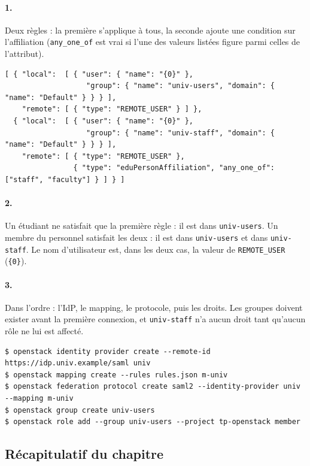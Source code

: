 \begin{correction}
\paragraph{1.} Deux règles : la première s'applique à tous, la seconde ajoute une condition sur l'affiliation (\texttt{any\_one\_of}
est vrai si l'une des valeurs listées figure parmi celles de l'attribut).
\begin{lstlisting}
[ { "local":  [ { "user": { "name": "{0}" },
                   "group": { "name": "univ-users", "domain": { "name": "Default" } } } ],
    "remote": [ { "type": "REMOTE_USER" } ] },
  { "local":  [ { "user": { "name": "{0}" },
                   "group": { "name": "univ-staff", "domain": { "name": "Default" } } } ],
    "remote": [ { "type": "REMOTE_USER" },
                { "type": "eduPersonAffiliation", "any_one_of": ["staff", "faculty"] } ] } ]
\end{lstlisting}
\paragraph{2.} Un étudiant ne satisfait que la première règle : il est dans \texttt{univ-users}. Un membre du personnel satisfait les
deux : il est dans \texttt{univ-users} et dans \texttt{univ-staff}. Le nom d'utilisateur est, dans les deux cas, la valeur de
\texttt{REMOTE\_USER} (\texttt{\{0\}}).
\paragraph{3.} Dans l'ordre : l'IdP, le mapping, le protocole, puis les droits. Les groupes doivent exister avant la première
connexion, et \texttt{univ-staff} n'a aucun droit tant qu'aucun rôle ne lui est affecté.
\begin{lstlisting}[style=terminal]
$ openstack identity provider create --remote-id https://idp.univ.example/saml univ
$ openstack mapping create --rules rules.json m-univ
$ openstack federation protocol create saml2 --identity-provider univ --mapping m-univ
$ openstack group create univ-users
$ openstack role add --group univ-users --project tp-openstack member
\end{lstlisting}
\end{correction}

\subsection{Récapitulatif du chapitre}\label{sec:ks-recap}

